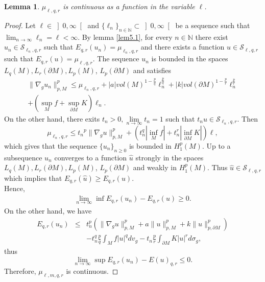 \documentclass{Tran-l}
\newtheorem{lem}[thm]{Lemma}
\theoremstyle{definition}
\theoremstyle{remark}
\numberwithin{equation}{section}
\begin{document}
\begin{lem}
$\mu_{\ell,q,r}$ is continuous as a function in the variable $\ell$.
\end{lem}
\begin{proof}
Let $\ell\in\left]0,\infty\right[$ and
$\{\ell_n\}_{n\in\mathbb{N}}\subset\left]0,\infty\right[$ be a
sequence such that $\lim_{n\rightarrow\infty}\ell_n=\ell<\infty$. By
lemma \ref{lem5.1}, for every $n\in\mathbb{N}$ there exist
$u_n\in{\mathcal{S}}_{\ell_n,q,r}$  such that $E_{q,r}(u_n)=\mu_{\ell_n,q,r}$
and there exists a function $u\in{\mathcal{S}}_{\ell,q,r}$ such that $
E_{q,r}(u)=\mu_{\ell,q,r}$. The sequence $u_n$ is bounded in the
spaces $L_q(M), L_r(\partial M),L_p(M)$, $L_p(\partial M)$ and
satisfies
\begin{eqnarray*}
&\|\nabla_gu_n\|_{p,M}^p\leq\mu_{\ell_n,q,r}+
|a|vol(M)^{1-\frac{p}{q}}\ell_n^{\frac{p}{q}}+|k|vol(\partial
M)^{1-\frac{p}{r}}\ell_n^{\frac{p}{r}}
&\\&+\left(\sup_Mf+\sup_{\partial M}K\right)\ell_n.
\end{eqnarray*}
On the other hand, there exits
$t_n>0,\underset{n\rightarrow\infty}{\lim}t_n=1$ such that
$t_{n}u\in{\mathcal{S}}_{\ell_n,q,r}$. Then
\begin{equation*}
\mu_{\ell_n,q,r}\leq{t_n}^p\|\nabla_gu\|_{p,M}^p+\left(t_n^q|\inf_Mf|+
t_n^r|\inf_{\partial M}K|\right)\ell,
\end{equation*}
which gives that the sequence $\{u_n\}_{n\geq0}$ is bounded in
$H_1^p(M)$. Up to a subsequence $u_n$ converges to a function
$\hat{u}$ strongly in the spaces $L_q(M), L_r(\partial M),L_p(M)$,
$L_p(\partial M)$ and weakly in $H_1^p(M)$. Thus $\hat{u}\in
{\mathcal{S}}_{\ell,q,r}$ which implies that
$E_{q,r}(\hat{u})\geq E_{q,r}(u)$.  \\
Hence,
\begin{eqnarray*}
\lim_{n\rightarrow\infty}\inf E_{q,r}(u_n)-E_{q,r}(u)\geq0.
\end{eqnarray*}
On the other hand, we have
\begin{eqnarray*}
E_{q,r}(u_n) &\leq& t_n^p\left(\|\nabla_gu\|_{p,M}^p+a\|u\|_{p,M}^p+
k\|u\|_{p,\partial M}^p\right) \\
&&-t_n^q\frac{p}{q}\int_Mf|u|^qdv_g-t_n\frac{p}{r}\int_{\partial
 M}K|u|^rd\sigma_g,
 \end{eqnarray*}
thus
\begin{equation*}
    \lim_{n\rightarrow\infty}\sup E_{q,r}(u_n)-E(u)_{q,r}\leq0.
\end{equation*}
Therefore, $\mu_{\ell,m,q,r}$ is continuous.
\end{proof}
\end{document}
